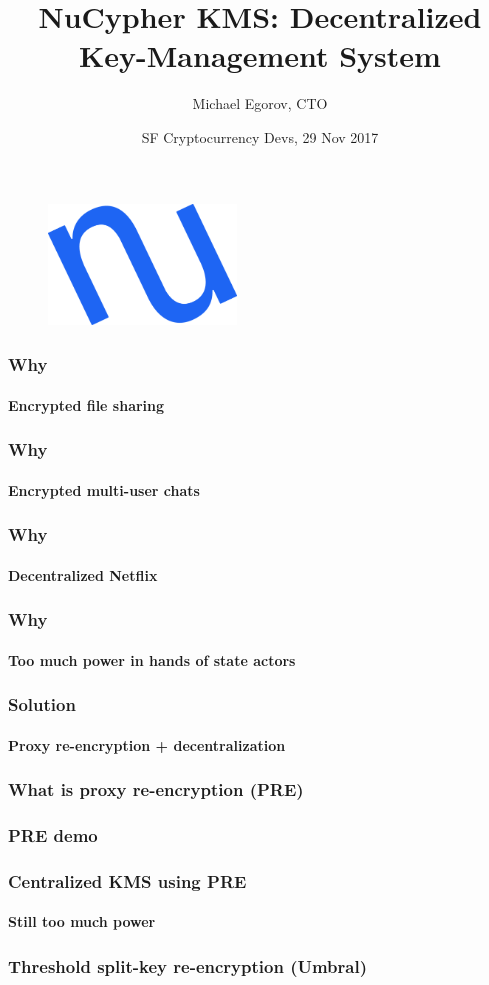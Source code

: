 \documentclass[xetex,mathsans,sans]{beamer}
\title[NuCypher KMS]{NuCypher KMS: Decentralized Key-Management System}
\author[Michael]{Michael Egorov, CTO}
\date[29 Nov 2017]{SF Cryptocurrency Devs, 29 Nov 2017}
\begin{document}
    \begin{frame}
        \titlepage
        \begin{figure}
            \centering
            \includegraphics[width=5cm]{pdf/nucypher_logo.pdf}
        \end{figure}
    \end{frame}

    \begin{frame}
        \frametitle{Why}
        \framesubtitle{Encrypted file sharing}
    \end{frame}

    \begin{frame}
        \frametitle{Why}
        \framesubtitle{Encrypted multi-user chats}
    \end{frame}

    \begin{frame}
        \frametitle{Why}
        \framesubtitle{Decentralized Netflix}
    \end{frame}

    \begin{frame}
        \frametitle{Why}
        \framesubtitle{Too much power in hands of state actors}
    \end{frame}

    \begin{frame}
        \frametitle{Solution}
        \framesubtitle{Proxy re-encryption + decentralization}
    \end{frame}

    \begin{frame}
        \frametitle{What is proxy re-encryption (PRE)}
    \end{frame}

    \begin{frame}
        \frametitle{PRE demo}
    \end{frame}

    \begin{frame}
        \frametitle{Centralized KMS using PRE}
        \framesubtitle{Still too much power}
    \end{frame}

    \begin{frame}
        \frametitle{Threshold split-key re-encryption (Umbral)}
    \end{frame}
\end{document}
